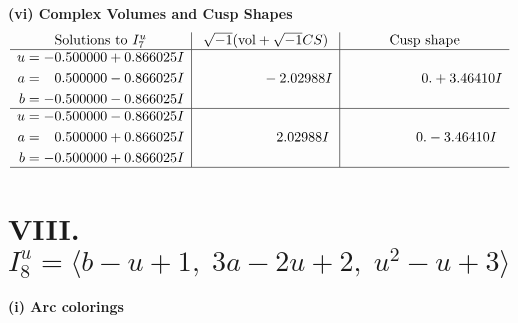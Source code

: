 \documentclass[1p]{elsarticle_modified}
\theoremstyle{definition}
\newcommand{\I}{\sqrt{-1}}
\begin{document}
\newpage\flushleft \textbf{(vi) Complex Volumes and Cusp Shapes}
$$\begin{array}{c|c|c}  
\text{Solutions to }I^u_{7}& \I (\text{vol} + \sqrt{-1}CS) & \text{Cusp shape}\\
 \hline 
\begin{aligned}
u &= -0.500000 + 0.866025 I \\
a &= \phantom{-}0.500000 - 0.866025 I \\
b &= -0.500000 - 0.866025 I\end{aligned}
 & \phantom{-0.000000 } -2.02988 I & \phantom{-0.000000 -}0. + 3.46410 I \\ \hline\begin{aligned}
u &= -0.500000 - 0.866025 I \\
a &= \phantom{-}0.500000 + 0.866025 I \\
b &= -0.500000 + 0.866025 I\end{aligned}
 & \phantom{-0.000000 -}2.02988 I & \phantom{-0.000000 } 0. - 3.46410 I\\
 \hline 
 \end{array}$$\newpage\newpage\renewcommand{\arraystretch}{1}
\centering \section*{VIII. $I^u_{8}= \langle b- u+1,\;3 a-2 u+2,\;u^2- u+3 \rangle$}
\flushleft \textbf{(i) Arc colorings}\\
\end{document}
